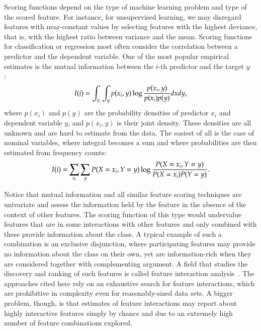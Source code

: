\begin{refsection}
Scoring functions depend on the type of machine learning problem and type of the scored feature. For instance, for unsupervised learning, we may disregard features with near-constant values by selecting features with the highest deviance, that is, with the highest ratio between variance and the mean. Scoring functions for classification or regression most often consider the correlation between a predictor and the dependent variable. One of the most popular empirical estimates is the mutual information between the $i$-th predictor and the target $y$ ~\citep{Guyon2003} :
$$
I(i)=\int_{x_i}\int_y p(x_i,y)\log{p(x_i,y)\over p(x_i)p(y)}dx dy,
$$
where $p(x_i)$ and $p(y)$ are the probability densities of predictor $x_i$ and dependent variable $y$, and $p(x_i,y)$ is their joint density. These densities are all unknown and are hard to estimate from the data. The easiest of all is the case of nominal variables, where integral becomes a sum and where probabilities are then estimated from frequency counts:
$$
I(i) = \sum_{x_i}\sum_{y} P(X=x_i, Y=y)\log {P(X=x_i,Y=y)\over P(X=x_i) P(Y=y)}.
$$

Notice that mutual information and all similar feature scoring techniques are univariate and assess the information held by the feature in the absence of the context of other features. The scoring function of this type would undervalue features that are in some interactions with other features and only combined with these provide information about the class. A typical example of such a combination is an exclusive disjunction, where participating features may provide no information about the class on their own, yet are information-rich when they are considered together with complementing argument. A field that studies the discovery and ranking of such features is called feature interaction analysis~\citep{Jakulin2005,Anastassiou2007}. The approaches cited here rely on an exhaustive search for feature interactions, which are prohibitive in complexity even for reasonably-sized data sets. A bigger problem, though, is that estimates of feature interactions may report about highly interactive features simply by chance and due to an extremely high number of feature combinations explored.


\end{refsection}
